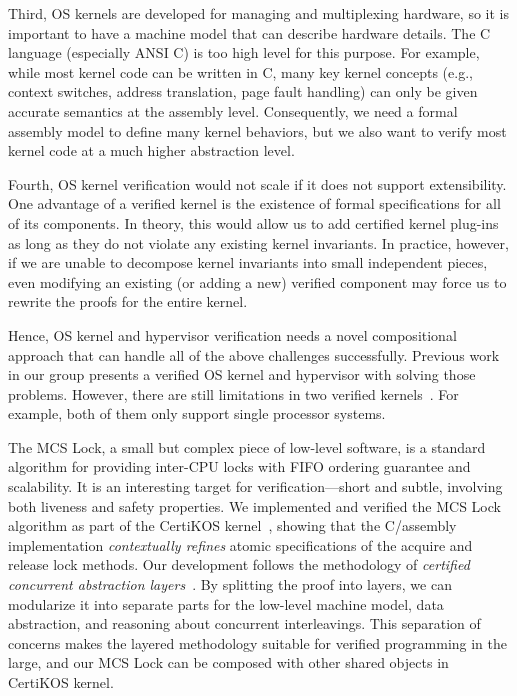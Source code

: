 Third, OS kernels are developed for managing and multiplexing hardware, so it is important to have a machine model that can describe hardware details.
The C language (especially ANSI C) is too high level for this purpose. For example, while most kernel code can be written in C, many key kernel concepts (e.g., context switches, address translation, page fault handling) can only be given accurate semantics at the assembly level. Consequently, we need a formal assembly model to define many kernel behaviors, but we also want to verify most kernel code at a much higher abstraction level.

Fourth, OS kernel verification would not scale if it does not  support extensibility.
One advantage of a verified kernel is the existence of formal specifications for all of its components. 
In theory, this would allow us to add certified kernel plug-ins as long as they do not violate any existing kernel invariants.
In practice, however, if we are unable to decompose kernel invariants into small independent pieces, even modifying an existing (or adding a new) verified component may force us to rewrite the proofs for the entire kernel.

Hence, OS kernel and hypervisor verification needs a novel compositional approach that can handle all of the above challenges successfully. 
Previous work~\cite{deepspec} in our group presents a verified OS kernel and hypervisor with solving those problems. 
However, there are still limitations in two verified kernels~\cite{deepspec, klein2009sel4}.
For example, both of them only support single processor systems.





The MCS Lock, a small but complex piece of low-level software, is a standard algorithm for providing inter-CPU locks with FIFO ordering guarantee and scalability.
It is an interesting target for verification---short and subtle, involving both liveness and safety properties. 
We implemented and verified the MCS Lock algorithm as part of the CertiKOS kernel~\cite{certikos:osdi16}, showing that the C/assembly implementation
 {\em contextually refines} atomic specifications of the acquire and release lock methods.
Our development follows the methodology of \emph{certified concurrent abstraction layers}~\cite{deepspec,concurrency}. 
By splitting the proof into layers, we can modularize it into separate parts for the low-level machine model, data abstraction, and reasoning about concurrent interleavings.  This separation of concerns makes the layered methodology suitable for verified programming in the large, and our MCS Lock can be composed with other shared objects in CertiKOS kernel.
